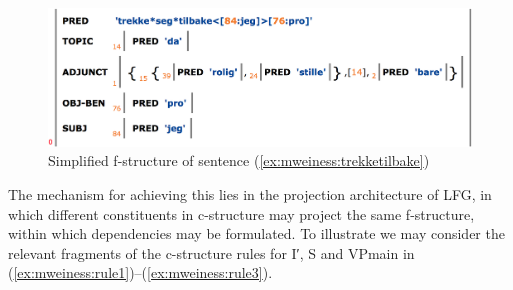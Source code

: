 \documentclass[output=paper]{langsci/langscibook}
\begin{document}
\begin{figure}
  \includegraphics[height=.175\textheight]{figures/trekketilbake-f.png}
  \caption{Simplified f-structure of sentence (\ref{ex:mweiness:trekketilbake})}
  \label{fig:mweiness:trekketilbake-f}
\end{figure}

The mechanism for achieving this lies in the projection architecture of LFG, in which different constituents in c-structure may project the same f-structure, within which dependencies may be formulated.
To illustrate we may consider the relevant fragments of the c-structure rules for I′, S and VPmain in (\ref{ex:mweiness:rule1})–(\ref{ex:mweiness:rule3}).


\end{document}
